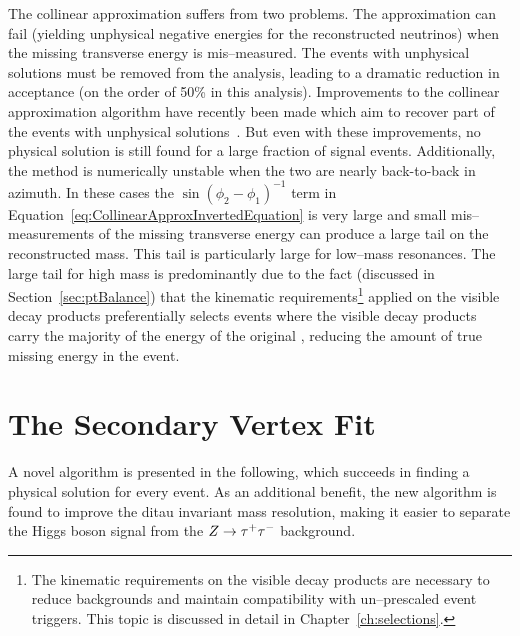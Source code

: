 The collinear approximation suffers from two problems.  The approximation can
fail (yielding unphysical negative energies for the reconstructed neutrinos)
when the missing transverse energy is mis--measured.  The events with unphysical
solutions must be removed from the analysis, leading to a dramatic reduction in
acceptance (on the order of 50\% in this analysis).  Improvements to the
collinear approximation algorithm have recently been made which aim to recover
part of the events with unphysical solutions~\cite{improvedCollinearApprox}.
But even with these improvements, no physical solution is still found for a
large fraction of signal events.  Additionally, the method is numerically
unstable when the two \taul are nearly back-to-back in azimuth.  In these cases
the $\sin(\phi_2 - \phi_1)^{-1}$ term in
Equation~\ref{eq:CollinearApproxInvertedEquation} is very large and small
mis--measurements of the missing transverse energy can produce a large tail on
the reconstructed mass.  This tail is particularly large for low--mass
resonances.  The large tail for high mass is predominantly due to the fact
(discussed in Section~\ref{sec:ptBalance}) that the kinematic
requirements\footnote{The kinematic requirements on the visible decay products
are necessary to reduce backgrounds and maintain compatibility with
un--prescaled event triggers.  This topic is discussed in detail in
Chapter~\ref{ch:selections}.} applied on the visible decay products
preferentially selects events where the visible decay products carry the
majority of the energy of the original \taul, reducing the amount of true
missing energy in the event.  

\section{The Secondary Vertex Fit}
A novel algorithm is presented in the following, which succeeds in finding a
physical solution for every event.  As an additional benefit, the new algorithm
is found to improve the ditau invariant mass resolution, making it easier to
separate the Higgs boson signal from the $\mbox{\ensuremath{Z\to\tau^+\tau^-}}$ background.

